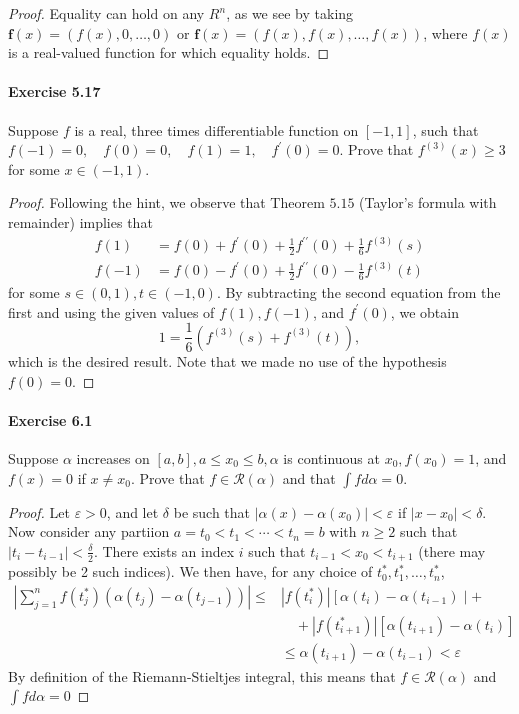 \documentclass{article}
\theoremstyle{definition}
\begin{document}
\begin{proof}
Equality can hold on any $R^n$, as we see by taking $\mathbf{f}(x)=(f(x), 0, \ldots, 0)$ or $\mathbf{f}(x)=(f(x), f(x), \ldots, f(x))$, where $f(x)$ is a real-valued function for which equality holds.

\end{proof}


\paragraph{Exercise 5.17} Suppose $f$ is a real, three times differentiable function on $[-1,1]$, such that $f(-1)=0, \quad f(0)=0, \quad f(1)=1, \quad f^{\prime}(0)=0 .$ Prove that $f^{(3)}(x) \geq 3$ for some $x \in(-1,1)$.
\begin{proof}
    Following the hint, we observe that Theorem $5.15$ (Taylor's formula with remainder) implies that
$$
\begin{aligned}
f(1) &=f(0)+f^{\prime}(0)+\frac{1}{2} f^{\prime \prime}(0)+\frac{1}{6} f^{(3)}(s) \\
f(-1) &=f(0)-f^{\prime}(0)+\frac{1}{2} f^{\prime \prime}(0)-\frac{1}{6} f^{(3)}(t)
\end{aligned}
$$
for some $s \in(0,1), t \in(-1,0)$. By subtracting the second equation from the first and using the given values of $f(1), f(-1)$, and $f^{\prime}(0)$, we obtain
$$
1=\frac{1}{6}\left(f^{(3)}(s)+f^{(3)}(t)\right),
$$
which is the desired result. Note that we made no use of the hypothesis $f(0)=0$.
\end{proof}


\paragraph{Exercise 6.1} Suppose $\alpha$ increases on $[a, b], a \leq x_{0} \leq b, \alpha$ is continuous at $x_{0}, f\left(x_{0}\right)=1$, and $f(x)=0$ if $x \neq x_{0}$. Prove that $f \in \mathcal{R}(\alpha)$ and that $\int f d \alpha=0$.
\begin{proof}
    Let $\varepsilon>0$, and let $\delta$ be such that $\left|\alpha(x)-\alpha\left(x_0\right)\right|<\varepsilon$ if $\left|x-x_0\right|<\delta$. Now consider any partiion $a=t_0<t_1<\cdots<t_n=b$ with $n \geq 2$ such that $\left|t_i-t_{i-1}\right|<\frac{\delta}{2}$. There exists an index $i$ such that $t_{i-1}<x_0<t_{i+1}$ (there may possibly be 2 such indices). We then have, for any choice of $t_0^*, t_1^*, \ldots, t_n^*$,
$$
\begin{aligned}
\left|\sum_{j=1}^n f\left(t_j^*\right)\left(\alpha\left(t_j\right)-\alpha\left(t_{j-1}\right)\right)\right| \leq &\left|f\left(t_i^*\right)\right|\left[\alpha\left(t_i\right)-\alpha\left(t_{i-1}\right) \mid+\right.\\
& \quad+\left|f\left(t_{i+1}^*\right)\right|\left[\alpha\left(t_{i+1}\right)-\alpha\left(t_i\right)\right] \\
& \leq \alpha\left(t_{i+1}\right)-\alpha\left(t_{i-1}\right)<\varepsilon
\end{aligned}
$$
By definition of the Riemann-Stieltjes integral, this means that $f \in \mathcal{R}(\alpha)$ and $\int f d \alpha=0$
\end{proof}
\end{document}
